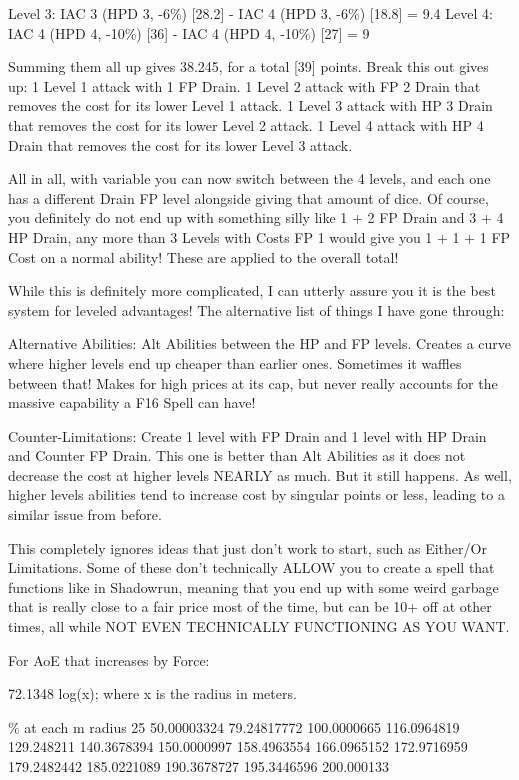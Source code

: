 \begin{multicols*}{2}
	Level 3: IAC 3 (HPD 3, -6\%) [28.2] - IAC 4 (HPD 3, -6\%) [18.8] = 9.4
	Level 4: IAC 4 (HPD 4, -10\%) [36] - IAC 4 (HPD 4, -10\%) [27] = 9
	
	Summing them all up gives 38.245, for a total [39] points.
	Break this out gives up:
	1 Level 1 attack with 1 FP Drain.
	1 Level 2 attack with FP 2 Drain that removes the cost for its lower Level 1 attack.
	1 Level 3 attack with HP 3 Drain that removes the cost for its lower Level 2 attack.
	1 Level 4 attack with HP 4 Drain that removes the cost for its lower Level 3 attack.
	
	All in all, with variable you can now switch between the 4 levels, and each one has a different Drain FP level alongside giving that amount of dice. Of course, you definitely do not end up with something silly like 1 + 2 FP Drain and 3 + 4 HP Drain, any more than 3 Levels with Costs FP 1 would give you 1 + 1 + 1 FP Cost on a normal ability! These are applied to the overall total!
	
	While this is definitely more complicated, I can utterly assure you it is the best system for leveled advantages! The alternative list of things I have gone through:
	
	Alternative Abilities: Alt Abilities between the HP and FP levels. Creates a curve where higher levels end up cheaper than earlier ones. Sometimes it waffles between that! Makes for high prices at its cap, but never really accounts for the massive capability a F16 Spell can have!
	
	Counter-Limitations: Create 1 level with FP Drain and 1 level with HP Drain and Counter FP Drain. This one is better than Alt Abilities as it does not decrease the cost at higher levels NEARLY as much. But it still happens. As well, higher levels abilities tend to increase cost by singular points or less, leading to a similar issue from before.
	
	This completely ignores ideas that just don't work to start, such as Either/Or Limitations. Some of these don't technically ALLOW you to create a spell that functions like in Shadowrun, meaning that you end up with some weird garbage that is really close to a fair price most of the time, but can be 10+ off at other times, all while NOT EVEN TECHNICALLY FUNCTIONING AS YOU WANT.
	
	For AoE that increases by Force:
	
	72.1348 log(x); where x is the radius in meters.
	
	
	\% at each m radius
	25
	50.00003324
	79.24817772
	100.0000665
	116.0964819
	129.248211
	140.3678394
	150.0000997
	158.4963554
	166.0965152
	172.9716959
	179.2482442
	185.0221089
	190.3678727
	195.3446596
	200.000133
	

\end{multicols*}
